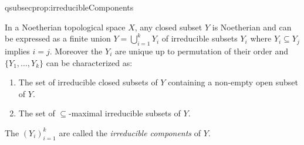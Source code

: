 \documentclass[DIV=14,parskip=full,pointednumbers]{scrartcl}
\renewenvironment{itemize}{\begin{enumerate}[label={$\bullet$},ref=\curthm]}{\end{enumerate}}
\theoremstyle{cthm}
\theoremstyle{cvarthm}
\theoremstyle{cdef}
\newcommand{\lbl}[1]{
	\label{#1}
	\ifmmode
	\expandafter\xdef\csname eqsubsec#1\endcsname{\thesubsection}
	\fi
}
\begin{document}
	\begin{prop}[a.k.a. Proposition 2]\lbl{prop:irreducibleComponents}
		In a Noetherian topological space $X$, any closed subset $Y$ is Noetherian and can be expressed as a finite union $Y= \bigcup_{i=1}^k Y_i$ of irreducible subsets $Y_i$ where $Y_i\subseteq Y_j$ implies $i=j$. Moreover the $Y_i$ are unique up to permutation of their order and $\{Y_1,\ldots, Y_k\}$ can be characterized as:
		\begin{itemize}
			\item The set of irreducible closed subsets of $Y$ containing a non-empty open subset of $Y$.
			\item The set of $\subseteq$-maximal irreducible subsets of $Y$.
		\end{itemize}
		The $(Y_i)_{i=1}^k$ are called the \emph{irreducible components} of $Y$.
	\end{prop}
\end{document}
